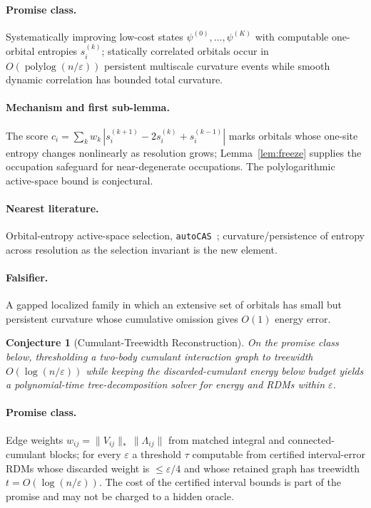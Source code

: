 \documentclass[11pt]{article}
\newtheorem{conjecture}{Conjecture}
\theoremstyle{definition}
\newcommand{\eps}{\varepsilon}
\newcommand{\polylog}{\operatorname{polylog}}
\begin{document}
\paragraph{Promise class.}  Systematically improving low-cost states
$\psi^{(0)},\dots,\psi^{(K)}$ with computable one-orbital entropies $s_i^{(k)}$;
statically correlated orbitals occur in $O(\polylog(n/\eps))$ persistent
multiscale curvature events while smooth dynamic correlation has bounded total
curvature.
\paragraph{Mechanism and first sub-lemma.}  The score
$c_i=\sum_k w_k\,|s_i^{(k+1)}-2s_i^{(k)}+s_i^{(k-1)}|$ marks orbitals whose
one-site entropy changes nonlinearly as resolution grows; Lemma~\ref{lem:freeze}
supplies the occupation safeguard for near-degenerate occupations.  The
polylogarithmic active-space bound is conjectural.
\paragraph{Nearest literature.}  Orbital-entropy active-space selection,
\texttt{autoCAS}~\cite{R10}; curvature/persistence of entropy across resolution as
the selection invariant is the new element.
\paragraph{Falsifier.}  A gapped localized family in which an extensive set of
orbitals has small but persistent curvature whose cumulative omission gives
$O(1)$ energy error.

\begin{conjecture}[Cumulant-Treewidth Reconstruction]\label{p4}
On the promise class below, thresholding a two-body cumulant interaction graph to
treewidth $O(\log(n/\eps))$ while keeping the discarded-cumulant energy below
budget yields a polynomial-time tree-decomposition solver for energy and RDMs
within $\eps$.
\end{conjecture}
\paragraph{Promise class.}  Edge weights $w_{ij}=\lVert V_{ij}\rVert_*\,\lVert\Lambda_{ij}\rVert$
from matched integral and connected-cumulant blocks; for every $\eps$ a threshold
$\tau$ computable from certified interval-error RDMs whose discarded weight is
$\le\eps/4$ and whose retained graph has treewidth $t=O(\log(n/\eps))$.  The cost
of the certified interval bounds is part of the promise and may not be charged to
a hidden oracle.
\end{document}
